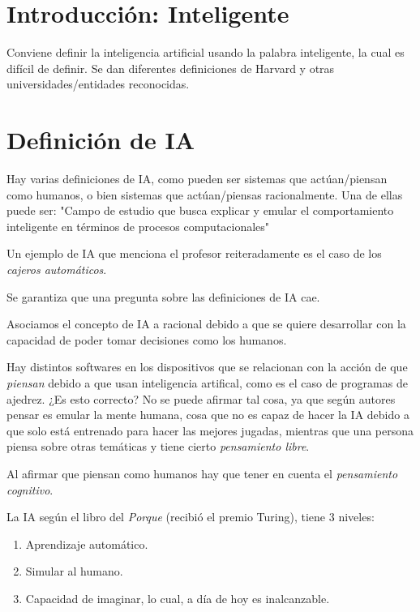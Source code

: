 \section{Introducción: Inteligente}
Conviene definir la inteligencia artificial
usando la palabra inteligente, la cual es difícil de definir. Se dan diferentes definiciones de Harvard y otras universidades/entidades reconocidas. 

\section{Definición de IA}

Hay varias definiciones de IA, como pueden ser sistemas que actúan/piensan como humanos, o bien sistemas que actúan/piensas racionalmente. Una de ellas puede ser: "Campo de estudio que busca explicar y emular el comportamiento inteligente en términos de procesos computacionales"

Un ejemplo de IA que menciona el profesor reiteradamente es el caso de los \textit{cajeros automáticos}.

\begin{tcolorbox}[colback=blue!20, colframe=blue]
Se garantiza que una pregunta sobre las definiciones de IA cae.
    
\end{tcolorbox}

Asociamos el concepto de IA a racional debido a que se quiere desarrollar con la capacidad de poder tomar decisiones como los humanos.

Hay distintos softwares en los dispositivos que se relacionan con la acción de que \textit{piensan} debido a que usan inteligencia artifical, como es el caso de programas de ajedrez. ¿Es esto correcto? No se puede afirmar tal cosa, ya que según autores pensar es emular la mente humana, cosa que no es capaz de hacer la IA debido a que solo está entrenado para hacer las mejores jugadas, mientras que una persona piensa sobre otras temáticas y tiene cierto \textit{pensamiento libre}.

Al afirmar que piensan como humanos hay que tener en cuenta el \textit{pensamiento cognitivo}.

La IA según el libro del \textit{Porque} (recibió el premio Turing), tiene 3 niveles:
\begin{enumerate}
    \item Aprendizaje automático.
    \item Simular al humano.
    \item Capacidad de imaginar, lo cual, a día de hoy es inalcanzable.
\end{enumerate}

